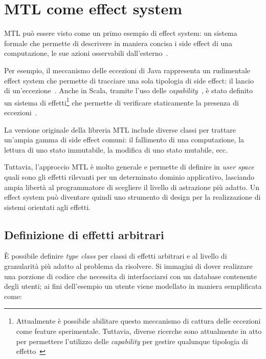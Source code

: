 \section{MTL come effect system}

MTL può essere visto come un primo esempio di effect system: un sistema formale che permette di descrivere in maniera concisa i side effect di una computazione, le sue azioni osservabili dall'esterno~\cite[p.~943]{cit:design-concepts-in-programming-languages}.

Per esempio, il meccanismo delle eccezioni di Java rappresenta un rudimentale effect system che permette di tracciare una sola tipologia di side effect: il lancio di un'eccezione~\cite[p.~985]{cit:design-concepts-in-programming-languages}.
Anche in Scala, tramite l'uso delle \emph{capability}~\cite{cit:scala-3-reference-canthrow}, è stato definito un sistema di effetti\footnote{Attualmente è possibile abilitare questo meccanismo di cattura delle eccezioni come feature sperimentale. Tuttavia, diverse ricerche sono attualmente in atto per permettere l'utilizzo delle \emph{capability} per gestire qualunque tipologia di effetto~\cite{cit:effects-capabilities-and-boxes-from-scope-based-reasoning-to-type-based-reasoning-and-back,cit:caprese}} che permette di verificare staticamente la presenza di eccezioni~\cite{cit:safer-exceptions-for-scala}.

La versione originale della libreria MTL include diverse classi per trattare un'ampia gamma di side effect comuni: il fallimento di una computazione, la lettura di uno stato immutabile, la modifica di uno stato mutabile, ecc.

Tuttavia, l'approccio MTL è molto generale e permette di definire in \emph{user space} quali sono gli effetti rilevanti per un determinato dominio applicativo, lasciando ampia libertà al programmatore di scegliere il livello di astrazione più adatto.
Un effect system può diventare quindi uno strumento di design per la realizzazione di sistemi orientati agli effetti.

\subsection{Definizione di effetti arbitrari}
\label{sec:mtl-effetti-arbitrari}
È possibile definire \emph{type class} per classi di effetti arbitrari e al livello di granularità più adatto al problema da risolvere. Si immagini di dover realizzare una porzione di codice che necessita di interfacciarsi con un database contenente degli utenti; ai fini dell'esempio un utente viene modellato in maniera semplificata come:

